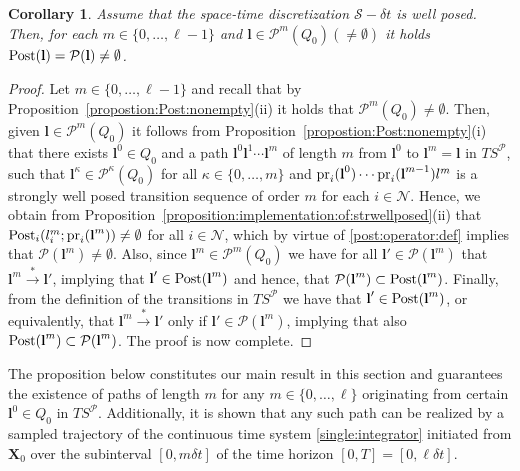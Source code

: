\documentclass[reqno]{amsart}
\theoremstyle{plain}
\newtheorem{corollary}[thm]{Corollary}
\theoremstyle{definition}
\numberwithin{equation}{section}
\begin{document}
\begin{corollary} \label{corollary:Post:nonempty}
Assume that the space-time discretization ${\ensuremath{\mathcal{S}}}-\delta t$ is well posed. Then, for each $m\in\{0,\ldots,\ell-1\}$ and ${\textbf{{l}}}\in{\ensuremath{\mathcal{P}}}^m(Q_0)(\ne\emptyset)$ it holds ${\rm Post}({\textbf{{l}}})={\ensuremath{\mathcal{P}}}({\textbf{{l}}})\ne \emptyset$.  
\end{corollary}

\begin{proof}
Let  $m\in\{0,\ldots,\ell-1\}$ and recall that by Proposition~\ref{propostion:Post:nonempty}(ii) it holds that ${\ensuremath{\mathcal{P}}}^m(Q_0)\ne\emptyset$. Then, given ${\textbf{{l}}}\in{\ensuremath{\mathcal{P}}}^m(Q_0)$ it follows from Proposition~\ref{propostion:Post:nonempty}(i) that there exists  ${\textbf{{l}}}^0\in Q_0$ and a path ${\textbf{{l}}}^0 {\textbf{{l}}}^1\cdots{\textbf{{l}}}^m$ of length $m$ from ${\textbf{{l}}}^0$ to ${\textbf{{l}}}^m={\textbf{{l}}}$ in $TS^{\ensuremath{\mathcal{P}}}$, such that ${\textbf{{l}}}^{\kappa}\in{\ensuremath{\mathcal{P}}}^{\kappa}(Q_0)$ for all $\kappa\in\{0,\ldots,m\}$ and ${\rm pr}_i({\textbf{{l}}}^0)\cdots{\rm pr}_i({\textbf{{l}}}^{m-1})l^m$ is a strongly well posed transition sequence of order $m$ for each $i\in{\ensuremath{\mathcal{N}}}$. Hence, we obtain from Proposition~\ref{proposition:implementation:of:strwellposed}(ii) that ${\rm Post}_i(l_i^m;{\rm pr}_i({\textbf{{l}}}^m))\ne\emptyset$ for all $i\in{\ensuremath{\mathcal{N}}}$, which by virtue of \eqref{post:operator:def} implies that ${\ensuremath{\mathcal{P}}}({\textbf{{l}}}^m)\ne\emptyset$. Also, since ${\textbf{{l}}}^m\in{\ensuremath{\mathcal{P}}}^m(Q_0)$ we have for all ${\textbf{{l}}}'\in{\ensuremath{\mathcal{P}}}({\textbf{{l}}}^m)$ that ${\textbf{{l}}}^m \overset{*}{\longrightarrow}{\textbf{{l}}}'$, implying that  ${\textbf{{l}}}'\in{\rm Post}({\textbf{{l}}}^m)$ and hence, that  ${\ensuremath{\mathcal{P}}}({\textbf{{l}}}^m)\subset{\rm Post}({\textbf{{l}}}^m)$. Finally, from the definition of the transitions in $TS^{\ensuremath{\mathcal{P}}}$ we have that ${\textbf{{l}}}'\in{\rm Post}({\textbf{{l}}}^m)$, or equivalently, that ${\textbf{{l}}}^m \overset{*}{\longrightarrow}{\textbf{{l}}}'$ only if ${\textbf{{l}}}'\in{\ensuremath{\mathcal{P}}}({\textbf{{l}}}^m)$, implying that also ${\rm Post}({\textbf{{l}}}^m)\subset{\ensuremath{\mathcal{P}}}({\textbf{{l}}}^m)$. The proof is now complete.
\end{proof}

The proposition below constitutes our main result in this section and guarantees the existence of paths of length $m$ for any $m\in\{0,\ldots,\ell\}$ originating from certain ${\textbf{{l}}}^0\in Q_0$ in $TS^{\ensuremath{\mathcal{P}}}$. Additionally, it is shown that any such path can be realized by a sampled trajectory of the continuous time system \eqref{single:integrator} initiated from ${\textbf{{X}}}_{0}$ over the subinterval $[0,m\delta t]$ of the time horizon $[0,T]=[0,\ell\delta t]$. 
\end{document}
